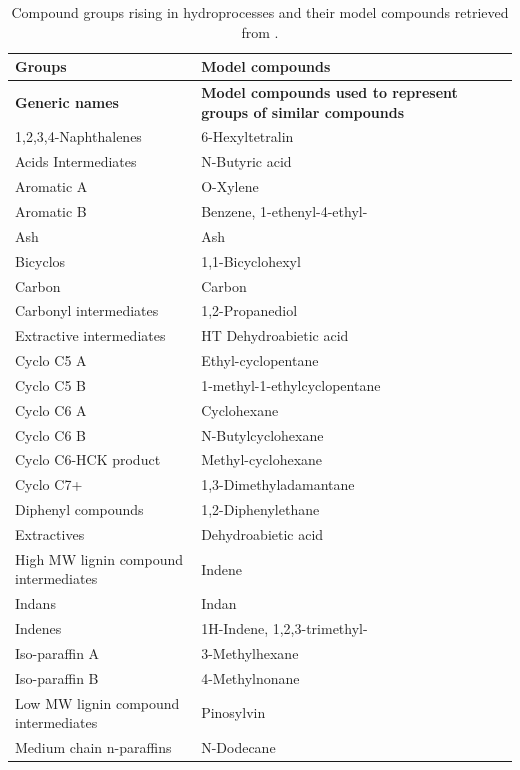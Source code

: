 \documentclass[11pt]{article}
\begin{document}
\FloatBarrier
\begin{longtable}{|p{}|p{}|}
\caption{Compound groups rising in hydroprocesses and their model compounds retrieved from \cite{jones2013process}.} \label{tab:compounds-from-hydroprocess}\\
\hline
\textbf{Groups} & \textbf{Model compounds} \\
\hline
\endfirsthead

\hline
\textbf{Generic names} & \textbf{Model compounds used to represent groups of similar compounds} \\
\hline
\endhead

1,2,3,4-Naphthalenes & 6-Hexyltetralin \\ \hline
Acids Intermediates & N-Butyric acid \\ \hline
Aromatic A & O-Xylene \\ \hline
Aromatic B & Benzene, 1-ethenyl-4-ethyl- \\ \hline
Ash & Ash \\ \hline
Bicyclos & 1,1-Bicyclohexyl \\ \hline
Carbon & Carbon \\ \hline
Carbonyl intermediates & 1,2-Propanediol \\ \hline
Extractive intermediates & HT Dehydroabietic acid \\ \hline
Cyclo C5 A & Ethyl-cyclopentane \\ \hline
Cyclo C5 B & 1-methyl-1-ethylcyclopentane \\ \hline
Cyclo C6 A & Cyclohexane \\ \hline
Cyclo C6 B & N-Butylcyclohexane \\ \hline
Cyclo C6-HCK product & Methyl-cyclohexane \\ \hline
Cyclo C7+ & 1,3-Dimethyladamantane \\ \hline
Diphenyl compounds & 1,2-Diphenylethane \\ \hline
Extractives & Dehydroabietic acid \\ \hline
High MW lignin compound intermediates & Indene \\ \hline
Indans & Indan \\ \hline
Indenes & 1H-Indene, 1,2,3-trimethyl- \\ \hline
Iso-paraffin A & 3-Methylhexane \\ \hline
Iso-paraffin B & 4-Methylnonane \\ \hline
Low MW lignin compound intermediates & Pinosylvin \\ \hline
Medium chain n-paraffins & N-Dodecane \\ \hline

\end{longtable}
\end{document}
